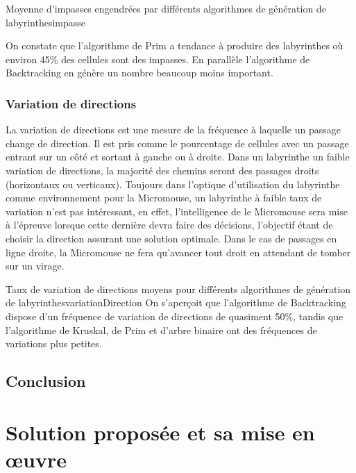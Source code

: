 {Moyenne d'impasses engendrées par différents algorithmes de génération de labyrinthes}{impasse}


On constate que l'algorithme de Prim a tendance à produire des labyrinthes où environ 45\% des cellules sont des impasses. En parallèle l'algorithme de Backtracking en génère un nombre beaucoup moins important.


\subsubsection{Variation de directions}
La variation de directions est une mesure de la fréquence à laquelle un passage change de direction. Il est pris comme le pourcentage de cellules avec un passage entrant sur un côté et sortant à gauche ou à droite.
Dans un labyrinthe un faible variation de directions, la majorité des chemins seront des passages droits (horizontaux ou verticaux). Toujours dans l'optique d'utilisation du labyrinthe comme environnement pour la Micromouse, un labyrinthe à faible taux de variation n'est pas intéressant, en effet, l'intelligence de le Micromouse sera mise à l'épreuve lorsque cette dernière devra faire des décisions, l'objectif étant de choisir la direction assurant une solution optimale. Dans le cas de passages en ligne droite, la Micromouse ne fera qu'avancer tout droit en attendant de tomber sur un virage.


{Taux de variation de directions moyens pour différents algorithmes de génération de labyrinthes}{variationDirection}
On s'aperçoit que l'algorithme de Backtracking dispose d'un fréquence de variation de directions de quasiment 50\%, tandis que l'algorithme de Kruskal, de Prim et d'arbre binaire ont des fréquences de variations plus petites.
\subsection{Conclusion}

\newpage


\section{Solution proposée et sa mise en œuvre} \label{sec:solution2}
